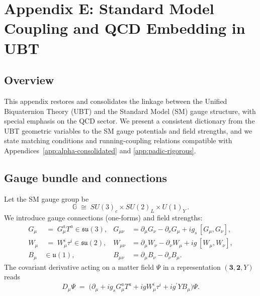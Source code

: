 
\section{Appendix E: Standard Model Coupling and QCD Embedding in UBT}
\label{app:sm-qcd-ubt}

\subsection{Overview}
This appendix restores and consolidates the linkage between the Unified Biquaternion Theory (UBT) and the
Standard Model (SM) gauge structure, with special emphasis on the QCD sector. We present a consistent dictionary
from the UBT geometric variables to the SM gauge potentials and field strengths, and we state matching conditions
and running-coupling relations compatible with Appendices~\ref{app:alpha-consolidated} and \ref{app:padic-rigorous}.

\subsection{Gauge bundle and connections}
Let the SM gauge group be
\[
\mathbb{G} \;\cong\; SU(3)_c \times SU(2)_L \times U(1)_Y\,.
\]
We introduce gauge connections (one-forms) and field strengths:
\begin{align}
G_\mu &\;=\; G_\mu^a T^a \in \mathfrak{su}(3), &
G_{\mu\nu} &= \partial_\mu G_\nu - \partial_\nu G_\mu + i g_s\,[G_\mu, G_\nu], \\
W_\mu &\;=\; W_\mu^i \tau^i \in \mathfrak{su}(2), &
W_{\mu\nu} &= \partial_\mu W_\nu - \partial_\nu W_\mu + i g\,[W_\mu, W_\nu], \\
B_\mu &\in \mathfrak{u}(1), &
B_{\mu\nu} &= \partial_\mu B_\nu - \partial_\nu B_\mu.
\end{align}
The covariant derivative acting on a matter field $\Psi$ in a representation $(\mathbf{3},\mathbf{2},Y)$ reads
\begin{equation}
D_\mu \Psi \;=\; \Big(\partial_\mu + i g_s G_\mu^a T^a + i g W_\mu^i \tau^i + i g^\prime Y B_\mu\Big)\Psi.
\end{equation}

